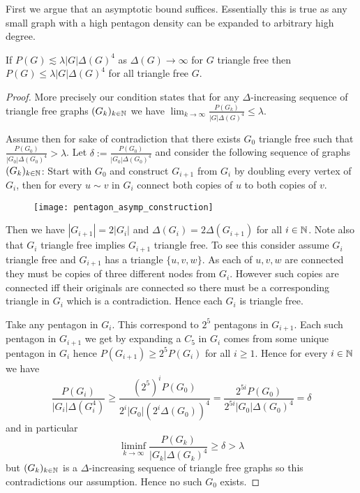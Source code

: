 First we argue that an asymptotic bound suffices. Essentially this is true as any small
graph with a high pentagon density can be expanded to arbitrary high degree.
\begin{lemma}
    \label{lemma:pentagon_asymp_suffices}
    If $P(G) \lesssim \lambda|G|\Delta(G)^4$ as $\Delta(G)\to\infty$ for
    $G$ triangle free
    then $P(G) \leq \lambda|G|\Delta(G)^4$ for all triangle free $G$.
\end{lemma}

\begin{proof}
    More precisely our condition states that for any $\Delta$-increasing sequence of
    triangle free graphs $(G_k)_{k\in\mathbb{N}}$ we have
    $\lim_{k\to\infty} \frac{P(G_k)}{|G|\Delta(G)^4} \leq \lambda$.

    Assume then for sake of contradiction that there exists $G_0$ triangle free
    such that $\frac{P(G_0)}{|G_0|\Delta(G_0)^4} > \lambda$.
    Let $\delta := \frac{P(G_0)}{|G_0|\Delta(G_0)^4}$ and consider the following
    sequence of graphs $(G_k)_{k\in\mathbb{N}}$: Start with $G_0$ and construct
    $G_{i+1}$ from $G_i$ by doubling every vertex of $G_i$, then for every
    $u\sim v$ in $G_i$ connect both copies of $u$ to both copies of $v$.

    \begin{figure}[!ht]
        \centering
        \texttt{[image: pentagon\_asymp\_construction]}
    \end{figure}

    Then we have $|G_{i+1}| = 2|G_i|$ and $\Delta(G_i) = 2\Delta(G_{i+1})$ for all
    $i\in\mathbb{N}$. Note also that $G_i$ triangle free implies $G_{i+1}$ triangle free.
    To see this consider assume $G_i$ triangle free and $G_{i+1}$ has a triangle
    $\{u, v, w\}$. As each of $u,v,w$ are connected they must be copies of three
    different nodes from $G_i$. However such copies are connected iff their originals are
    connected so there must be a corresponding triangle in $G_i$ which is a contradiction.
    Hence each $G_i$ is triangle free.

    Take any pentagon in $G_i$. This correspond to $2^5$ pentagons in $G_{i+1}$. Each
    such pentagon in $G_{i+1}$ we get by expanding a $C_5$ in $G_i$ comes from
    some unique pentagon in $G_i$ hence $P(G_{i+1}) \geq 2^5P(G_i)$ for all $i\geq 1$.
    Hence for every $i\in\mathbb{N}$ we have
    \[
        \frac{P(G_i)}{|G_i|\Delta(G_i^4)} \geq
        \frac{(2^5)^i P(G_0)}{2^i|G_0|(2^i\Delta(G_0))^4}
        = \frac{2^{5i} P(G_0)}{2^{5i}|G_0|\Delta(G_0)^4}
        = \delta
    \]
    and in particular
    \[
        \liminf_{k\to\infty}\frac{P(G_k)}{|G_k|\Delta(G_k)^4}
        \geq \delta > \lambda
    \]
    but $(G_k)_{k\in\mathbb{N}}$ is a $\Delta$-increasing sequence of triangle free graphs
    so this contradictions our assumption. Hence no such $G_0$ exists.
\end{proof}

